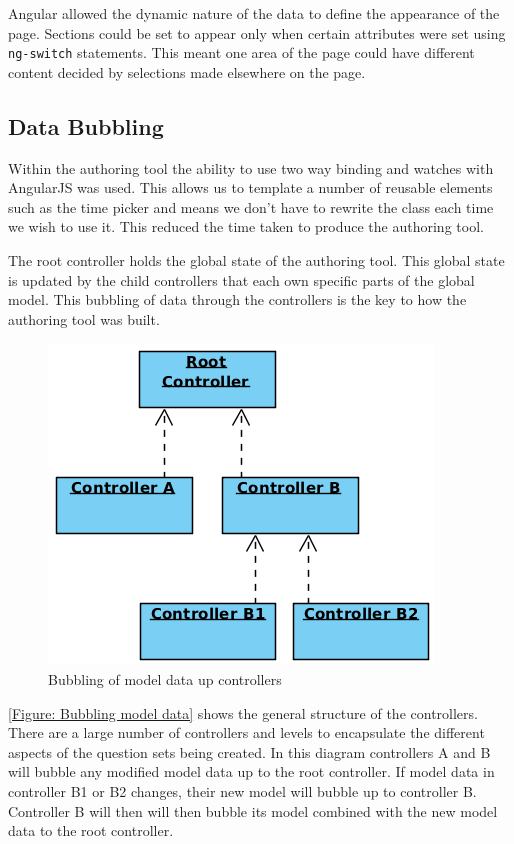 Angular allowed the dynamic nature of the data to define the appearance of the page. Sections could be set to appear only when certain attributes were set using \lstinline|ng-switch| statements. This meant one area of the page could have different content decided by selections made elsewhere on the page.

\subsection{Data Bubbling}
\label{Section:Authoring_Data_bubbling}

Within the authoring tool the ability to use two way binding and watches with AngularJS was used. This allows us to template a number of reusable elements such as the time picker and means we don't have to rewrite the class each time we wish to use it. This reduced the time taken to produce the authoring tool.

The root controller holds the global state of the authoring tool. This global state is updated by the child controllers that each own specific parts of the global model. This bubbling of data through the controllers is the key to how the authoring tool was built.

\begin{figure}[h]
	\centering
		\includegraphics[scale=0.4]{../figures/authoring_tool/controller_bubbling.png} 		
	\caption{\label{Figure: Bubbling model data} Bubbling of model data up controllers} 	
\end{figure}

\autoref{Figure: Bubbling model data} shows the general structure of the controllers. There are a large number of controllers and levels to encapsulate the different aspects of the question sets being created. In this diagram controllers A and B will bubble any modified model data up to the root controller. If model data in controller B1 or B2 changes, their new model will bubble up to controller B. Controller B will then will then bubble its model combined with the new model data to the root controller.

